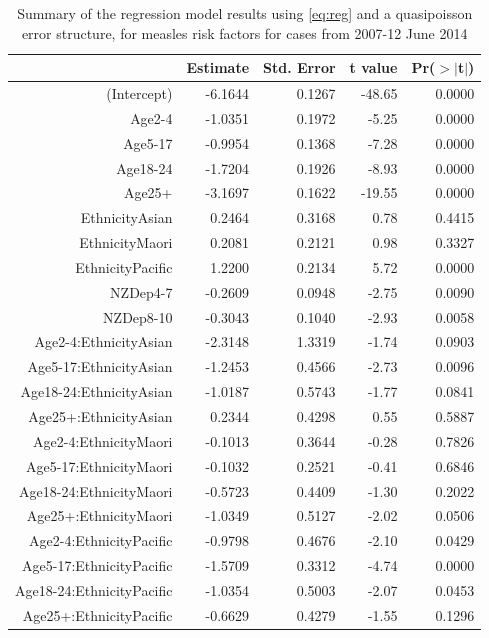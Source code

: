 \documentclass{article}
\begin{document}
\vspace{5mm} %
\begin{table}
\begin{tabular}{rrrrr}
  \hline
 & Estimate & Std. Error & t value & Pr($>$$|$t$|$) \\ 
  \hline
(Intercept) & -6.1644 & 0.1267 & -48.65 & 0.0000 \\ 
  Age2-4 & -1.0351 & 0.1972 & -5.25 & 0.0000 \\ 
  Age5-17 & -0.9954 & 0.1368 & -7.28 & 0.0000 \\ 
  Age18-24 & -1.7204 & 0.1926 & -8.93 & 0.0000 \\ 
  Age25+ & -3.1697 & 0.1622 & -19.55 & 0.0000 \\ 
  EthnicityAsian & 0.2464 & 0.3168 & 0.78 & 0.4415 \\ 
  EthnicityMaori & 0.2081 & 0.2121 & 0.98 & 0.3327 \\ 
  EthnicityPacific & 1.2200 & 0.2134 & 5.72 & 0.0000 \\ 
  NZDep4-7 & -0.2609 & 0.0948 & -2.75 & 0.0090 \\ 
  NZDep8-10 & -0.3043 & 0.1040 & -2.93 & 0.0058 \\ 
  Age2-4:EthnicityAsian & -2.3148 & 1.3319 & -1.74 & 0.0903 \\ 
  Age5-17:EthnicityAsian & -1.2453 & 0.4566 & -2.73 & 0.0096 \\ 
  Age18-24:EthnicityAsian & -1.0187 & 0.5743 & -1.77 & 0.0841 \\ 
  Age25+:EthnicityAsian & 0.2344 & 0.4298 & 0.55 & 0.5887 \\ 
  Age2-4:EthnicityMaori & -0.1013 & 0.3644 & -0.28 & 0.7826 \\ 
  Age5-17:EthnicityMaori & -0.1032 & 0.2521 & -0.41 & 0.6846 \\ 
  Age18-24:EthnicityMaori & -0.5723 & 0.4409 & -1.30 & 0.2022 \\ 
  Age25+:EthnicityMaori & -1.0349 & 0.5127 & -2.02 & 0.0506 \\ 
  Age2-4:EthnicityPacific & -0.9798 & 0.4676 & -2.10 & 0.0429 \\ 
  Age5-17:EthnicityPacific & -1.5709 & 0.3312 & -4.74 & 0.0000 \\ 
  Age18-24:EthnicityPacific & -1.0354 & 0.5003 & -2.07 & 0.0453 \\ 
  Age25+:EthnicityPacific & -0.6629 & 0.4279 & -1.55 & 0.1296 \\ 
   \hline
\end{tabular}\caption{Summary of the regression model results using \autoref{eq:reg} and a quasipoisson error structure, for measles risk factors for cases from 2007-12 June 2014}
\label{table:regression_riskfactors}
\end{table}
\end{document}
